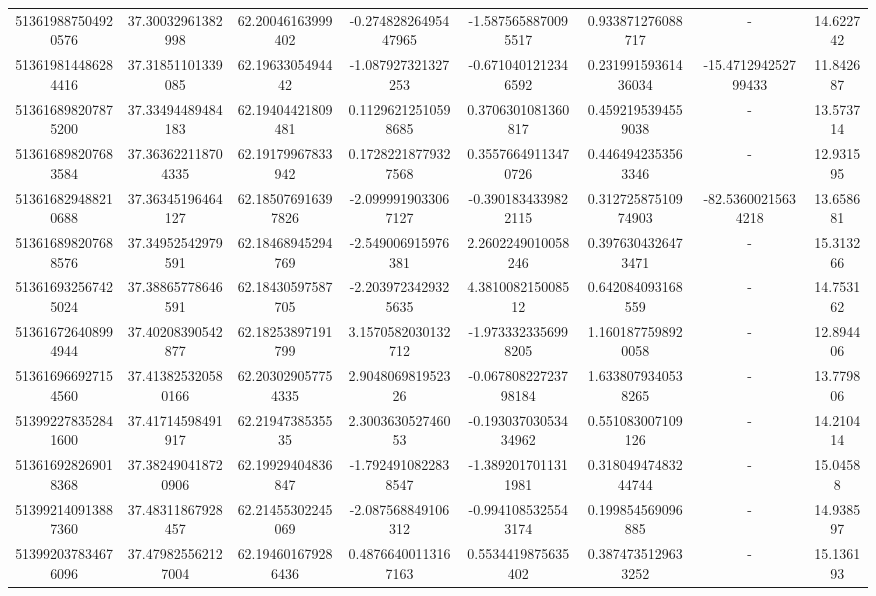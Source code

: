 \documentclass{article}
\begin{document}
\begin{landscape}
\begin{longtable}[c]{S[table-format=18.0]S[table-format=2.15]S[table-format=2.15]S[table-format=-2.17]S[table-format=-2.16]S[table-format=-2.16]S[table-format=-3.16]S[table-format=2.7]}
513619887504920576 & 37.30032961382998  & 62.20046163999402  & -0.27482826495447965  & -1.5875658870095517   & 0.933871276088717   & {-}                  & 14.622742  \\
513619814486284416 & 37.31851101339085  & 62.1963305494442   & -1.087927321327253    & -0.6710401212346592   & 0.23199159361436034 & -15.471294252799433 & 11.842687  \\
513616898207875200 & 37.33494489484183  & 62.19404421809481  & 0.11296212510598685   & 0.3706301081360817    & 0.4592195394559038  & {-}                  & 13.573714  \\
513616898207683584 & 37.363622118704335 & 62.19179967833942  & 0.17282218779327568   & 0.35576649113470726   & 0.4464942353563346  & {-}                  & 12.931595  \\
513616829488210688 & 37.36345196464127  & 62.185076916397826 & -2.0999919033067127   & -0.3901834339822115   & 0.31272587510974903 & -82.53600215634218  & 13.658681  \\
513616898207688576 & 37.34952542979591  & 62.18468945294769  & -2.549006915976381    & 2.2602249010058246    & 0.3976304326473471  & {-}                  & 15.313266  \\
513616932567425024 & 37.38865778646591  & 62.18430597587705  & -2.2039723429325635   & 4.381008215008512     & 0.642084093168559   & {-}                  & 14.753162  \\
513616726408994944 & 37.40208390542877  & 62.18253897191799  & 3.1570582030132712    & -1.9733323356998205   & 1.1601877598920058  & {-}                  & 12.894406  \\
513616966927154560 & 37.413825320580166 & 62.203029057754335 & 2.904806981952326     & -0.06780822723798184  & 1.6338079340538265  & {-}                  & 13.779806  \\
513992278352841600 & 37.41714598491917  & 62.2194738535535   & 2.300363052746053     & -0.19303703053434962  & 0.551083007109126   & {-}                  & 14.210414  \\
513616928269018368 & 37.382490418720906 & 62.19929404836847  & -1.7924910822838547   & -1.3892017011311981   & 0.31804947483244744 & {-}                  & 15.04588   \\
513992140913887360 & 37.48311867928457  & 62.21455302245069  & -2.087568849106312    & -0.9941085325543174   & 0.199854569096885   & {-}                  & 14.938597  \\
513992037834676096 & 37.479825562127004 & 62.194601679286436 & 0.48766400113167163   & 0.5534419875635402    & 0.3874735129633252  & {-}                  & 15.136193  \\

\end{longtable}
\end{landscape}
\end{document}
